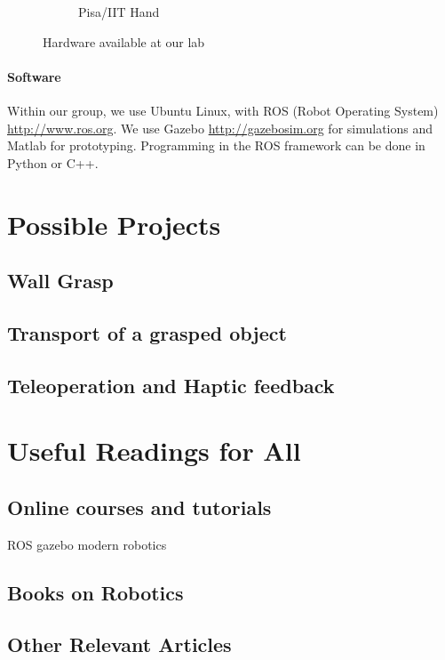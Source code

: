 \documentclass[]{article}
\begin{document}
\begin{figure}[hb!]
\begin{subfigure}[b]{0.22\columnwidth}
		\caption{\footnotesize Pisa/IIT Hand}
		\label{fig:soft_hand}
	\end{subfigure}
	\caption{Hardware available at our lab\vspace*{-10pt}}
\end{figure}

\paragraph{Software} Within our group, we use Ubuntu Linux, with ROS (Robot Operating System)\\ \url{http://www.ros.org}. We use Gazebo \url{http://gazebosim.org} for simulations and Matlab for prototyping. Programming in the ROS framework can be done in Python or C++.


\pagebreak
\section{Possible Projects}
\subsection{Wall Grasp}

\pagebreak
\subsection{Transport of a grasped object}



\pagebreak
\subsection{Teleoperation and Haptic feedback}


\pagebreak
\section{Useful Readings for All}
\subsection{Online courses and tutorials}

ROS
gazebo
modern robotics

\subsection{Books on Robotics}
\subsection{Other Relevant Articles}

\end{document}
